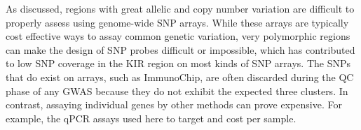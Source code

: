 



As discussed, regions with great allelic and copy number variation are difficult to properly assess using genome-wide SNP arrays.
While these arrays are typically cost effective ways to assay common genetic variation, very polymorphic regions can make the design of SNP probes
difficult or impossible, which has contributed to low SNP coverage in the KIR region on most kinds of SNP arrays.
The SNPs that do exist on arrays, such as ImmunoChip, are often discarded during the QC phase of any GWAS because they do not exhibit the expected three clusters.
In contrast, assaying individual genes by other methods can prove expensive.
For example, the qPCR assays used here to target  and  cost  per sample.


